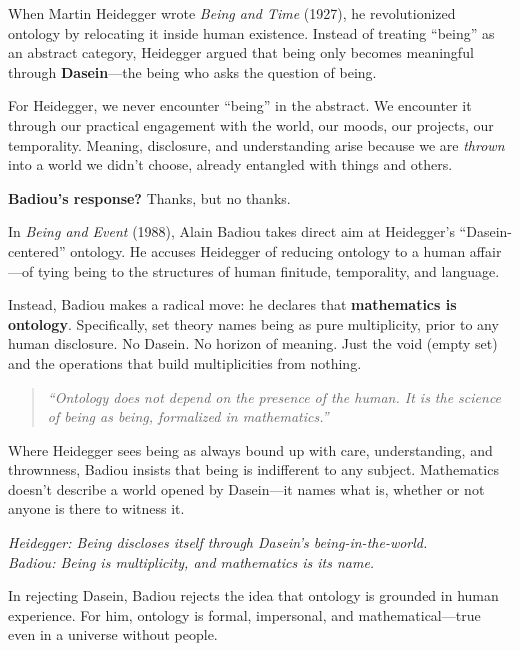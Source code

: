 \begin{tcolorbox}[colback=gray!5!white, colframe=black, title=\textbf{Historical Sidebar: Heidegger’s Dasein—and Why Badiou Walked Away}, fonttitle=\bfseries, arc=1.5mm, boxrule=0.4pt]

    When Martin Heidegger wrote \textit{Being and Time} (1927), he revolutionized ontology by relocating it inside human existence. Instead of treating “being” as an abstract category, Heidegger argued that being only becomes meaningful through \textbf{Dasein}—the being who asks the question of being.
    
    For Heidegger, we never encounter “being” in the abstract. We encounter it through our practical engagement with the world, our moods, our projects, our temporality. Meaning, disclosure, and understanding arise because we are \emph{thrown} into a world we didn’t choose, already entangled with things and others.
    
    \medskip
    
    \textbf{Badiou’s response?} Thanks, but no thanks.
    
    In \textit{Being and Event} (1988), Alain Badiou takes direct aim at Heidegger’s “Dasein-centered” ontology. He accuses Heidegger of reducing ontology to a human affair—of tying being to the structures of human finitude, temporality, and language.
    
    Instead, Badiou makes a radical move: he declares that \textbf{mathematics is ontology}. Specifically, set theory names being as pure multiplicity, prior to any human disclosure. No Dasein. No horizon of meaning. Just the void (empty set) and the operations that build multiplicities from nothing.
    
    \begin{quote}
    \textit{“Ontology does not depend on the presence of the human. It is the science of being as being, formalized in mathematics.”}
    \end{quote}
    
    Where Heidegger sees being as always bound up with care, understanding, and thrownness, Badiou insists that being is indifferent to any subject. Mathematics doesn’t describe a world opened by Dasein—it names what is, whether or not anyone is there to witness it.
    
    \medskip
    
    \begin{center}
    \textit{Heidegger: Being discloses itself through Dasein’s being-in-the-world.} \\
    \textit{Badiou: Being is multiplicity, and mathematics is its name.}
    \end{center}
    
    \medskip
    
    In rejecting Dasein, Badiou rejects the idea that ontology is grounded in human experience. For him, ontology is formal, impersonal, and mathematical—true even in a universe without people.
    
\end{tcolorbox}
